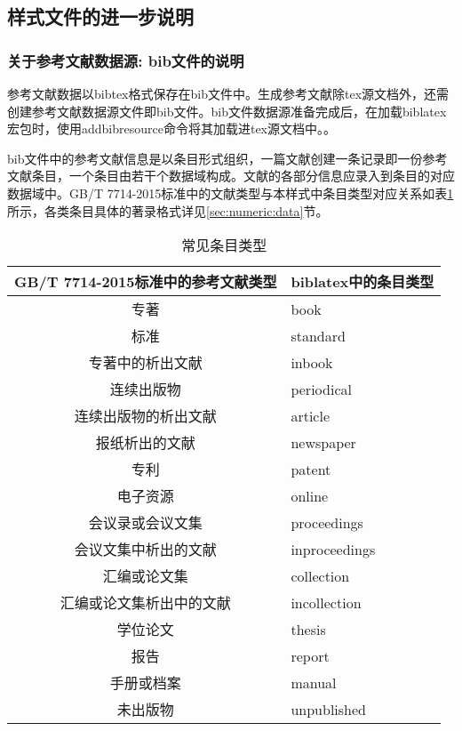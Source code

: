 \subsection{样式文件的进一步说明}

\subsubsection{关于参考文献数据源: bib文件的说明}\label{sec:bib:bibtex}

参考文献数据以bibtex格式保存在bib文件中。生成参考文献除tex源文档外，还需创建参考文献数据源文件即bib文件。bib文件数据源准备完成后，在加载biblatex宏包时，使用addbibresource命令将其加载进tex源文档中。。

bib文件中的参考文献信息是以条目形式组织，一篇文献创建一条记录即一份参考文献条目，一个条目由若干个数据域构成。文献的各部分信息应录入到条目的对应数据域中。GB/T 7714-2015标准中的文献类型与本样式中条目类型对应关系如表\ref{tab:entrytypes}所示，各类条目具体的著录格式详见\ref{sec:numeric:data}节。
\begin{table}[!htb]
\centering
\caption{常见条目类型}\label{tab:entrytypes}
\begin{tabular}{cl}
\hline
  GB/T 7714-2015标准中的参考文献类型 &  biblatex中的条目类型\\ \hline
  专著& book\\
  标准& standard\\
  专著中的析出文献& inbook\\
  连续出版物& periodical\\
  连续出版物的析出文献& article\\
  报纸析出的文献& newspaper\\
  专利& patent\\
  电子资源& online\\
  会议录或会议文集& proceedings\\
  会议文集中析出的文献& inproceedings\\
  汇编或论文集& collection\\
  汇编或论文集析出中的文献& incollection\\
  学位论文& thesis\\
  报告& report\\
  手册或档案& manual\\
  未出版物& unpublished\\ \hline
  \end{tabular}
\end{table}

